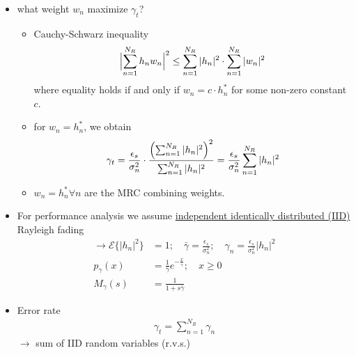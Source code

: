\documentclass[a4paper, 10pt]{article}
\begin{document}
\begin{itemize}
	\item what weight \begin{math}w_n\end{math} maximize \begin{math}\gamma _t\end{math}?
	\begin{itemize}
		\item Cauchy-Schwarz inequality
		\begin{align*}
			\Bigl | \sum_{n = 1}^{N_R}h_nw_n\Bigr |^2 \leq \sum_{n = 1}^{N_R}|h_n|^2 \cdot \sum_{n = 1}^{N_R}|w_n|^2
		\end{align*}
	where equality holds if and only if \begin{math}w_n = c\cdot h_n^*\end{math} for some non-zero constant \begin{math}c\end{math}.
		\item for \begin{math}w_n = h_n^*\end{math}, we obtain
		\begin{align*}
			\gamma _t = \frac{\epsilon _s}{\sigma _n^2}\cdot \frac{\Bigl ( \sum_{n = 1}^{N_R}|h_n|^2\Bigr ) ^2}{\sum_{n = 1}^{N_R}|h_n|^2} = \frac{\epsilon _s}{\sigma _n^2}\sum_{n = 1}^{N_R}|h_n|^2
		\end{align*}
		\item \begin{math}w_n = h_n^* \forall n\end{math} are the MRC combining weights.	
	\end{itemize}
	\item For performance analysis we assume \underline{independent identically distributed (IID)} Rayleigh fading
		\begin{align*}
			\rightarrow \mathcal{E}\{|h_n|^2\} &= 1; \quad \bar{\gamma} = \frac{\epsilon _s}{\sigma	_n^2}; \quad \gamma _n = \frac{\epsilon _s}{\sigma _n^2}|h_n|^2\\
			p_{\gamma}(x) &= \frac{1}{\bar{\gamma}}e^{-\frac{x}{\bar{\gamma}}}; \quad x\geq 0\\
			M_{\gamma}(s) &= \frac{1}{1+s\bar{\gamma}}
		\end{align*}		
	\item Error rate
			\begin{align*}
				\gamma _t = \sum_{n = 1}^{N_R}\gamma _n
			\end{align*}
			\begin{math}\rightarrow \end{math} sum of IID random variables (r.v.s.)

\end{itemize}
\end{document}
